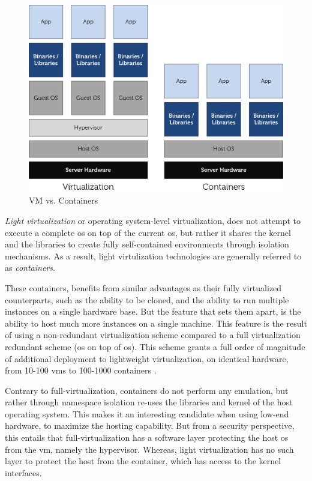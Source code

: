 \documentclass[12pt, titlepage]{uo_temp}
\begin{document}
     \begin{figure}[h]
       \centering
       \includegraphics[width=125mm]{images/lxc_vm.jpg}
       \caption{VM vs. Containers\label{vm_containers} \cite{dell}}
     \end{figure}

     \emph{Light virtualization} or operating system-level virtualization, does not
     attempt to execute a complete \gls{os} on top of the current \gls{os}, but rather it
     shares the kernel and the libraries to create fully self-contained environments
     through isolation mechanisms. As a result, light virtulization technologies are
     generally referred to as \emph{containers}.
 
     These containers, benefits from similar advantages as their fully virtualized
     counterparts, such as the ability to be cloned, and the ability to run multiple
     instances on a single hardware base. But the feature that sets them apart, is the
     ability to host much more instances on a single machine. This feature is the result
     of using a non-redundant virtualization scheme compared to a full virtualization
     redundant scheme (\gls{os} on top of \gls{os}). This scheme grants a full order of
     magnitude of additional deployment to lightweight virtualization, on identical
     hardware, from 10-100 \gls{vm}s to 100-1000 containers \cite{dell}.

     Contrary to full-virtualization, containers do not perform any
     emulation, but rather through namespace isolation re-uses the libraries and kernel of
     the host operating system. This makes it an interesting candidate when using low-end
     hardware, to maximize the hosting capability. But from a security perspective, this
     entails that full-virtualization has a software layer protecting the host \gls{os}
     from the \gls{vm}, namely the hypervisor. Whereas, light virtualization has no such
     layer to protect the host from the container, which has access to the kernel
     interfaces. 
\end{document}
